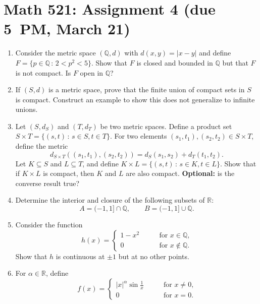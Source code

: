 \documentclass[12pt]{article}
\newcommand{\Q}{\mathbb{Q}}
\newcommand{\R}{\mathbb{R}}
\newcommand{\sep}{\,:\,}
\begin{document}
\section*{Math 521: Assignment 4 (due 5~PM, March 21)}
\begin{enumerate}
  \item Consider the metric space $(\Q,d)$ with $d(x,y) = |x-y|$ and define
    $F=\{ p\in \Q \sep 2<p^2<5\}$. Show that $F$ is closed and bounded in $\Q$
    but that $F$ is not compact. Is $F$ open in $\Q$?
  \item If $(S,d)$ is a metric space, prove that the finite union of compact
    sets in $S$ is compact. Construct an example to show this does not
    generalize to infinite unions.
  \item Let $(S,d_S)$ and $(T,d_T)$ be two metric spaces. Define a product set
    $S\times T=\{(s,t) \sep s\in S, t\in T\}$. For two elements $(s_1,t_1),
    (s_2,t_2)\in S\times T$, define the metric
    \begin{equation}
      d_{S\times T}((s_1,t_1),(s_2,t_2)) = d_S(s_1,s_2) + d_T(t_1,t_2).
    \end{equation}
    Let $K \subseteq S$ and $L \subseteq T$, and define $K\times L = \{(s,t)
    \sep s\in K, t\in L\}$. Show that if $K\times L$ is compact, then $K$ and
    $L$ are also compact. \textbf{Optional:} is the converse result true?
  \item Determine the interior and closure of the following subsets of $\R$:
    \begin{equation}
      A= (-1,1] \cap \Q, \qquad B = (-1,1] \cup \Q.
    \end{equation}
  \item Consider the function
    \begin{equation}
      h(x) = \begin{cases}
        1-x^2 & \qquad \text{for $x\in \Q$,} \\
        0 & \qquad \text{for $x\notin \Q$.}
      \end{cases}
    \end{equation}
    Show that $h$ is continuous at $\pm 1$ but at no other points.
  \item For $\alpha \in \R$, define
    \begin{equation}
      f(x) = \begin{cases}
        |x|^\alpha \sin \tfrac1x & \qquad \text{for $x\ne 0$,} \\
        0 & \qquad \text{for $x=0$.}
      \end{cases}

\end{equation}
\end{enumerate}
\end{document}
